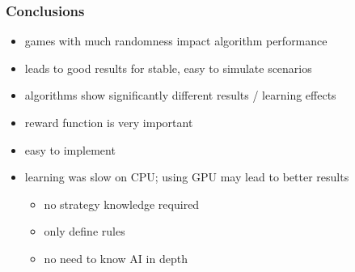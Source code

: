 \begin{frame}
    \frametitle{Conclusions}
    \begin{itemize}
        \item games with much randomness impact algorithm performance
        \item leads to good results for stable, easy to simulate scenarios
        \item algorithms show significantly different results / learning effects
        \item reward function is very important
        \item easy to implement
        \item learning was slow on CPU; using GPU may lead to better results
        \begin{itemize}
            \item no strategy knowledge required
            \item only define rules
            \item no need to know AI in depth
        \end{itemize}
    \end{itemize}
\end{frame}
